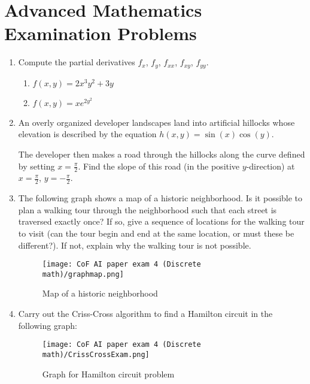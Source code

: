 \documentclass[12pt]{article}
\begin{document}
\section*{Advanced Mathematics Examination Problems}

\begin{enumerate}[label=\textbf{Problem \arabic*.}, leftmargin=*]

\item Compute the partial derivatives $f_{x}$, $f_{y}$, $f_{xx}$, $f_{xy}$, $f_{yy}$.
\begin{enumerate}[label=(\alph*)]
\item $f(x,y)= 2x^3y^2 + 3y$
\vspace{3cm}
\item $f(x,y) = x e^{2y^2}$
\vspace{3cm}
\end{enumerate}

\item An overly organized developer landscapes land into artificial hillocks whose elevation is described by the equation $h(x,y) = \sin(x) \cos(y)$. 

The developer then makes a road through the hillocks along the curve defined by setting $x=\frac{\pi}{2}$.  Find the slope of this road (in the positive $y$-direction) at $x=\frac{\pi}{2}$, $y=-\frac{\pi}{2}$.
\vspace{5cm}

\item The following graph shows a map of a historic neighborhood. Is it possible to plan a walking tour through the neighborhood such that each street is traversed exactly once? If so, give a sequence of locations for the walking tour to visit (can the tour begin and end at the same location, or must these be different?). If not, explain why the walking tour is not possible.

\begin{figure}[H]
\centering
\texttt{[image: CoF AI paper exam 4 (Discrete math)/graphmap.png]}
\caption{Map of a historic neighborhood}
\end{figure}
\vspace{3cm}

\item Carry out the Criss-Cross algorithm to find a Hamilton circuit in the following graph:
\begin{figure}[H]
\centering
\texttt{[image: CoF AI paper exam 4 (Discrete math)/CrissCrossExam.png]}
\caption{Graph for Hamilton circuit problem}
\end{figure}
\vspace{5cm}


\end{enumerate}
\end{document}
